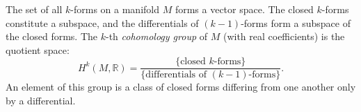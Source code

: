 The set of all $k$-forms on a manifold $M$ forms a vector space. The closed $k$-forms constitute a subspace, and the differentials of $(k-1)$-forms form a subspace of the closed forms. The $k$-th \textit{cohomology group} of $M$ (with real coefficients) is the quotient space:
$$H^k(M, \mathbb{R}) = \frac{\{\text{closed } k\text{-forms}\}}{\{\text{differentials of } (k-1)\text{-forms}\}}.$$
An element of this group is a class of closed forms differing from one another only by a differential.
